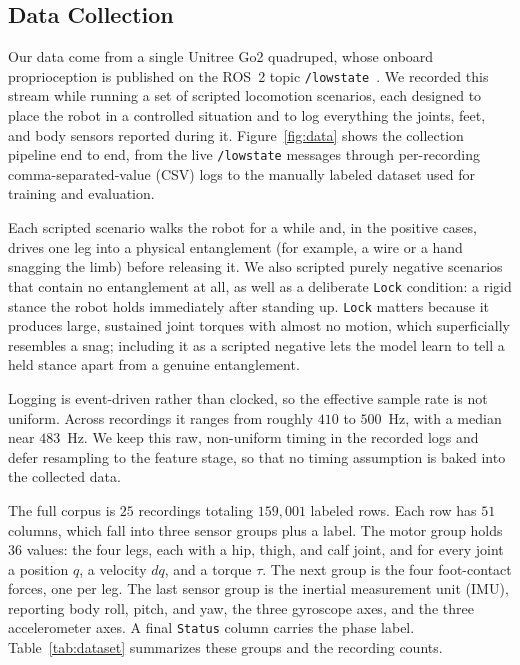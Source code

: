 \subsection{Data Collection}

Our data come from a single Unitree Go2 quadruped, whose onboard proprioception is published on the ROS~2 topic \texttt{/lowstate}~\cite{macenski2022ros2,unitree_go2}. We recorded this stream while running a set of scripted locomotion scenarios, each designed to place the robot in a controlled situation and to log everything the joints, feet, and body sensors reported during it. Figure~\ref{fig:data} shows the collection pipeline end to end, from the live \texttt{/lowstate} messages through per-recording comma-separated-value (CSV) logs to the manually labeled dataset used for training and evaluation.

Each scripted scenario walks the robot for a while and, in the positive cases, drives one leg into a physical entanglement (for example, a wire or a hand snagging the limb) before releasing it. We also scripted purely negative scenarios that contain no entanglement at all, as well as a deliberate \texttt{Lock} condition: a rigid stance the robot holds immediately after standing up. \texttt{Lock} matters because it produces large, sustained joint torques with almost no motion, which superficially resembles a snag; including it as a scripted negative lets the model learn to tell a held stance apart from a genuine entanglement.

Logging is event-driven rather than clocked, so the effective sample rate is not uniform. Across recordings it ranges from roughly $410$ to $500$~Hz, with a median near $483$~Hz. We keep this raw, non-uniform timing in the recorded logs and defer resampling to the feature stage, so that no timing assumption is baked into the collected data.

The full corpus is $25$ recordings totaling $159{,}001$ labeled rows. Each row has $51$ columns, which fall into three sensor groups plus a label. The motor group holds $36$ values: the four legs, each with a hip, thigh, and calf joint, and for every joint a position $q$, a velocity $dq$, and a torque $\tau$. The next group is the four foot-contact forces, one per leg. The last sensor group is the inertial measurement unit (IMU), reporting body roll, pitch, and yaw, the three gyroscope axes, and the three accelerometer axes. A final \texttt{Status} column carries the phase label. Table~\ref{tab:dataset} summarizes these groups and the recording counts.

